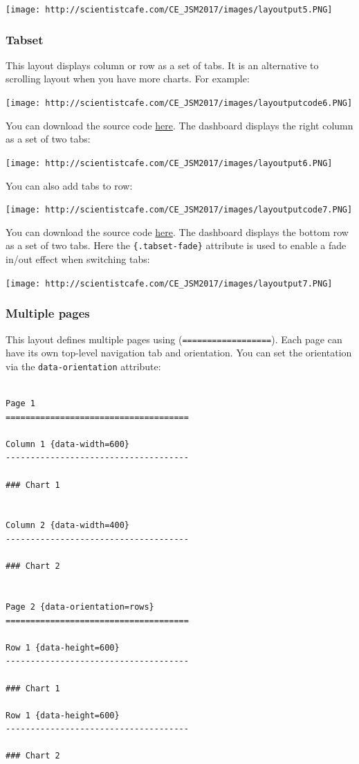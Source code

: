 \documentclass[]{book}
\theoremstyle{definition}
\theoremstyle{definition}
\theoremstyle{remark}
\begin{document}
\texttt{[image: http://scientistcafe.com/CE\_JSM2017/images/layoutput5.PNG]}

\subsubsection{Tabset}\label{tabset}

This layout displays column or row as a set of tabs. It is an
alternative to scrolling layout when you have more charts. For example:

\texttt{[image: http://scientistcafe.com/CE\_JSM2017/images/layoutputcode6.PNG]}

 You can download the source code
\href{https://raw.githubusercontent.com/happyrabbit/linhui.org/gh-pages/CE_JSM2017/Examples/TabsetCol.Rmd}{here}.
The dashboard displays the right column as a set of two tabs:

\texttt{[image: http://scientistcafe.com/CE\_JSM2017/images/layoutput6.PNG]}

You can also add tabs to row:

\texttt{[image: http://scientistcafe.com/CE\_JSM2017/images/layoutputcode7.PNG]}

 You can download the source code
\href{https://raw.githubusercontent.com/happyrabbit/linhui.org/gh-pages/CE_JSM2017/Examples/TabsetRow.Rmd}{here}.
The dashboard displays the bottom row as a set of two tabs. Here the
\texttt{\{.tabset-fade\}} attribute is used to enable a fade in/out
effect when switching tabs:

\texttt{[image: http://scientistcafe.com/CE\_JSM2017/images/layoutput7.PNG]}

\subsubsection{Multiple pages}\label{multiple-pages}

This layout defines multiple pages using (\texttt{==================}).
Each page can have its own top-level navigation tab and orientation. You
can set the orientation via the \texttt{data-orientation} attribute:

\begin{verbatim}

Page 1
=====================================  
    
Column 1 {data-width=600}
-------------------------------------
    
### Chart 1
    

Column 2 {data-width=400}
-------------------------------------
   
### Chart 2


Page 2 {data-orientation=rows}
=====================================     
   
Row 1 {data-height=600}
-------------------------------------

### Chart 1

Row 1 {data-height=600}
-------------------------------------

### Chart 2
\end{verbatim}
\end{document}
